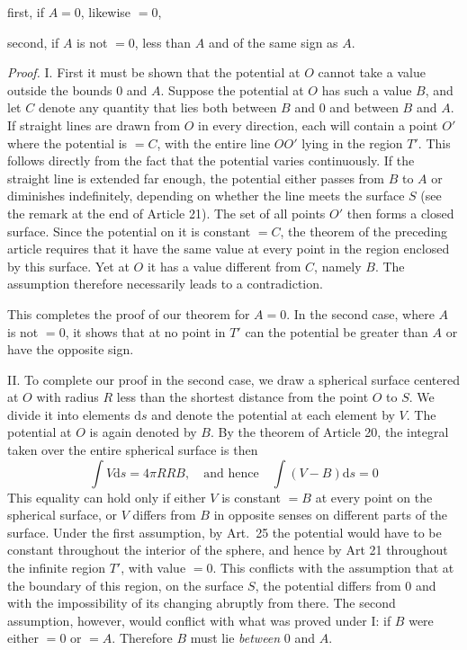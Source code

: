 \noindent first, if $A=0$, likewise $=0$,

\noindent second, if $A$ is not $=0$, less than $A$ and of the same sign as $A$.

\textit{Proof.} I. First it must be shown that the potential at $O$ cannot take a value outside the bounds $0$ and $A$. Suppose the potential at $O$ has such a value $B$, and let $C$ denote any quantity that lies both between $B$ and $0$ and between $B$ and $A$. If straight lines are drawn from $O$ in every direction, each will contain a point $O'$ where the potential is $=C$, with the entire line $OO'$ lying in the region $T'$. This follows directly from the fact that the potential varies continuously. If the straight line is extended far enough, the potential either passes from $B$ to $A$ or diminishes indefinitely, depending on whether the line meets the surface $S$ (see the remark at the end of Article 21). The set of all points $O'$ then forms a closed surface. Since the potential on it is constant $=C$, the theorem of the preceding article requires that it have the same value at every point in the region enclosed by this surface. Yet at $O$ it has a value different from $C$, namely $B$. The assumption therefore necessarily leads to a contradiction.

This completes the proof of our theorem for $A=0$. In the second case, where $A$ is not $=0$, it shows that at no point in $T'$ can the potential be greater than $A$ or have the opposite sign.

II. To complete our proof in the second case, we draw a spherical surface centered at $O$ with radius $R$ less than the shortest distance from the point $O$ to $S$. We divide it into elements $\mathrm ds$ and denote the potential at each element by $V$. The potential at $O$ is again denoted by $B$. By the theorem of Article 20, the integral taken over the entire spherical surface is then
\[
\int V\mathrm ds=4\pi RRB,\quad\text{and hence}\quad\int(V-B)\mathrm ds=0
\]
This equality can hold only if either $V$ is constant $=B$ at every point on the spherical surface, or $V$ differs from $B$ in opposite senses on different parts of the surface. Under the first assumption, by Art.\ 25 the potential would have to be constant throughout the interior of the sphere, and hence by Art 21 throughout the infinite region $T'$, with value $=0$. This conflicts with the assumption that at the boundary of this region, on the surface $S$, the potential differs from $0$ and with the impossibility of its changing abruptly from there. The second assumption, however, would conflict with what was proved under I: if $B$ were either $=0$ or $=A$. Therefore $B$ must lie \textit{between} $0$ and $A$.

